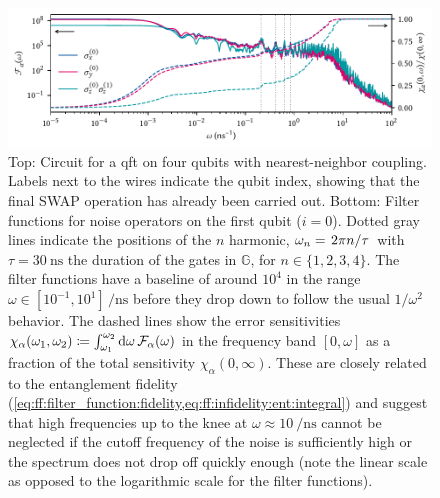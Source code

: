 \begin{figure}
    \centering
    
    \bigskip
    \includegraphics{img/pdf/filter_functions/qft_filter_function}
    \caption[]{
        Top: Circuit for a \gls{qft} on four qubits with nearest-neighbor coupling.
        Labels next to the wires indicate the qubit index, showing that the final SWAP operation has already been carried out.
        Bottom: Filter functions for noise operators on the first qubit ($i = 0$).
        Dotted gray lines indicate the positions of the $n$ harmonic, $\omega_n = \flatfrac{2\pi n}{\tau}$ with $\tau = \qty{30}{\nano\second}$ the duration of the gates in $\mathbb{G}$, for $n\in\lbrace 1, 2, 3, 4\rbrace$.
        The filter functions have a baseline of around $10^4$ in the range $\omega\in[10^{-1}, 10^{1}]\,\unit{\per\nano\second}$ before they drop down to follow the usual $1/\omega^2$ behavior.
        The dashed lines show the error sensitivities $\chi_\alpha(\omega_1,\omega_2)\coloneqq\int_{\omega_1}^{\omega_2}\dd{\omega} \mathcal{F}_\alpha(\omega)$ in the frequency band $[0, \omega]$ as a fraction of the total sensitivity $\chi_\alpha(0,\infty)$.
        These are closely related to the entanglement fidelity (\cf \cref{eq:ff:filter_function:fidelity,eq:ff:infidelity:ent:integral}) and suggest that high frequencies up to the knee at $\omega\approx\qty{10}{\per\nano\second}$ cannot be neglected if the cutoff frequency of the noise is sufficiently high or the spectrum does not drop off quickly enough (note the linear scale as opposed to the logarithmic scale for the filter functions).
    }
    \label{fig:ff:qft}
\end{figure}

